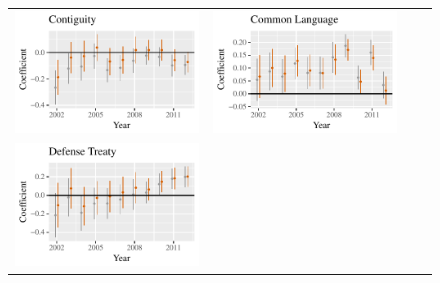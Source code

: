 \documentclass{article}
\begin{document}
\begin{figure}
\begin{tabular}{*{4}{@{}c}@{}}
\includegraphics[scale=.6]{draft_figures/rl_plots/Contiguity.pdf}  &
\includegraphics[scale=.6]{draft_figures/rl_plots/CommonLanguage.pdf}   \\
\includegraphics[scale=.6]{draft_figures/rl_plots/DefenseTreaty.pdf}    & 

\end{tabular}
\end{figure}
\end{document}
